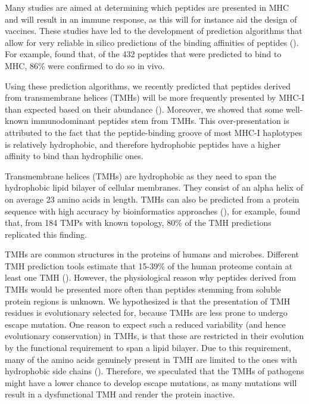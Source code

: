Many studies are aimed at determining which peptides are presented in MHC 
and will result in an immune response, 
as this will for instance aid the design of vaccines. 
These studies have led to the development 
of  prediction algorithms 
that allow for very reliable in silico predictions 
of the binding affinities of peptides (\cite{larsen2010identification,schellens2008unanticipated,tang2011genome}).
For example, \cite{tang2011genome} found that, 
of the 432 peptides that were predicted to bind to MHC,
86\% were confirmed to do so in vivo.


Using these prediction algorithms, 
we recently predicted that peptides derived 
from transmembrane helices (TMHs) 
will be more frequently presented by MHC-I 
than expected based on their abundance (\cite{bianchi2017}). 
Moreover, we showed that some well-known immunodominant peptides stem from TMHs. This over-presentation is attributed to the fact 
that the peptide-binding groove of most MHC-I haplotypes 
is relatively hydrophobic, 
and therefore hydrophobic peptides have a higher affinity to bind
than hydrophilic ones. 

Transmembrane helices (TMHs) are hydrophobic 
as they need to span the hydrophobic lipid bilayer of cellular membranes.
They consist of an alpha helix of on average 23 amino acids in length. TMHs can also be predicted from a protein sequence 
with high accuracy by bioinformatics approaches (\cite{krogh2001predicting,bianchi2017,kall2004combined,arai2004conpred,jones2007improving,klammer2009metatm,wang2019efficient}),
for example, \cite{jones2007improving} found that,
from 184 TMPs with known topology, 
80\% of the TMH predictions replicated this finding.
 
TMHs are common structures in the proteins of humans and microbes. 
Different TMH prediction tools estimate
that 15-39\% of the human proteome 
contain at least one TMH (\cite{ahram2006estimation}).
However, the physiological reason why peptides derived from TMHs 
would be presented more often than peptides 
stemming from soluble protein regions is unknown. 
We hypothesized is that the presentation of 
TMH residues is evolutionary selected for, 
because TMHs are less prone to undergo escape mutation. 
One reason to expect such a reduced 
variability (and hence evolutionary conservation) in TMHs, 
is that these are restricted in their evolution 
by the functional requirement to span a lipid bilayer. 
Due to this requirement, 
many of the amino acids genuinely present in TMH 
are limited to the ones with hydrophobic side chains (\cite{jones1994model}).
Therefore, we speculated that the TMHs of pathogens 
might have a lower chance to develop escape mutations, 
as many mutations will result in a dysfunctional TMH 
and render the protein inactive.

